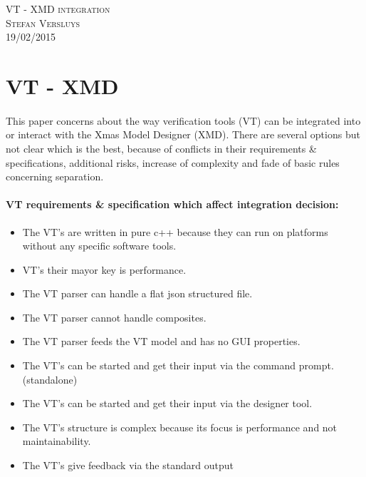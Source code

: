 \documentclass[a4paper,11pt,final]{article}
\begin{document}
\begin{titlepage}
	\vspace*{\fill}
	\begin{center}
		\textsc{\large VT - XMD integration}\\[0.5cm]
		\textsc{Stefan Versluys}\\ \textsc{\scriptsize 19/02/2015}\\[2.0cm]
	\end{center}
	\vspace*{\fill}
\end{titlepage}


\tableofcontents

\newpage

\section{VT - XMD}
\paragraph{}
This paper concerns about the way verification tools (VT) can be integrated
into or interact with the Xmas Model Designer (XMD). There are several
options but not clear which is the best, because of conflicts in their
requirements \& specifications, additional risks, increase of complexity
and fade of basic rules concerning separation. 


\paragraph{VT requirements \& specification which affect integration decision:}
\begin{itemize}
\item The VT’s are written in pure c++ because they can run on platforms without any specific software tools.
\item VT’s their mayor key is performance.
\item The VT parser can handle a flat json structured file.
\item The VT parser cannot handle composites.
\item The VT parser feeds the VT model and has no GUI properties.
\item The VT’s can be started and get their input via the command prompt. (standalone)
\item The VT’s can be started and get their input via the designer tool.
\item The VT’s structure is complex because its focus is performance and not maintainability.
\item The VT’s give feedback via the standard output
\end{itemize}
\end{document}
